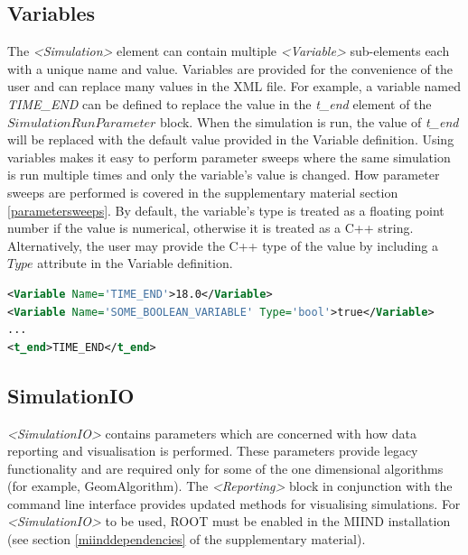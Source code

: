 \documentclass[utf8]{frontiersSCNS} %
\begin{document}
\subsection{Variables}
\label{variables}
The \textit{\textless Simulation\textgreater} element can contain multiple \textit{\textless Variable\textgreater} sub-elements each with a unique name and value. Variables are provided for the convenience of the user and can replace many values in the XML file. For example, a variable named \textit{TIME\_END} can be defined to replace the value in the \textit{t\_end} element of the $SimulationRunParameter$ block. When the simulation is run, the value of \textit{t\_end} will be replaced with the default value provided in the Variable definition. Using variables makes it easy to perform parameter sweeps where the same simulation is run multiple times and only the variable's value is changed. How parameter sweeps are performed is covered in the supplementary material section \ref{parametersweeps}.
By default, the variable's type is treated as a floating point number if the value is numerical, otherwise it is treated as a C++ string. Alternatively, the user may provide the C++ type of the value by including a $Type$ attribute in the Variable definition.\\

\begin{lstlisting}[language=xml]
<Variable Name='TIME_END'>18.0</Variable>
<Variable Name='SOME_BOOLEAN_VARIABLE' Type='bool'>true</Variable>
...
<t_end>TIME_END</t_end>
\end{lstlisting}

\subsection{SimulationIO}

\textit{\textless SimulationIO\textgreater} contains parameters which are concerned with how data reporting and visualisation is performed. These parameters provide legacy functionality and are required only for some of the one dimensional algorithms (for example, GeomAlgorithm). The \textit{\textless Reporting\textgreater} block in conjunction with the command line interface provides updated methods for visualising simulations. For \textit{\textless SimulationIO\textgreater} to be used, ROOT must be enabled in the MIIND installation (see section \ref{miinddependencies} of the supplementary material). \\
\end{document}
